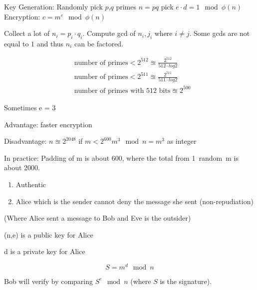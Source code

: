
\begin{defn}[RAS]
    Key Generation: Randomly pick $p$,$q$ primes $n = pq$ pick $e \cdot d = 1 \mod \phi (n)$
    Encryption: $c = m^e \mod \phi (n)$
\end{defn}

Collect a lot of $n_i = p_i\cdot q_i$. Compute gcd of $n_i,j_i$ where $i\neq j$. Some gcds are not equal to $1$ and thus $n_i$ can be factored.


\begin{align*}
    &\text{number of primes} < 2^{512} \approxeq \frac{2^{512}}{512\cdot log2}\\
    &\text{number of primes} < 2^{511} \approxeq \frac{2^{511}}{511 \cdot log2}\\
    &\text{number of primes with 512 bits} \approxeq {2^{500}}
\end{align*}

\begin{exmp}
    Sometimes e = 3
    
    Advantage: faster encryption
    
    Disadvantage: $n \approxeq 2^{2048}$ if $m < 2^{600} m^3 \mod n = m^3$ as integer
    
    In practice: Padding of m is about 600, where the total from 1~random~m is about 2000. 
\end{exmp}


\begin{enumerate}
    \item Authentic
    \item Alice which is the sender cannot deny the message she sent (non-repudiation)
\end{enumerate}


\begin{exmp}\leavevmode
(Where Alice sent a message to Bob and Eve is the outsider)

    (n,e) is a public key for Alice
    
    d is a private key for Alice
    
    \[S = m^d \mod n\]
    
    Bob will verify by comparing $S^e \mod n$ (where $S$ is the signature).
\end{exmp}


